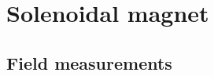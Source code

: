 
\section[Solenoidal magnet (Eugene)]{Solenoidal magnet \label{sec:solenoid}}
\subsection{Field measurements \label{sec:bfield}}


